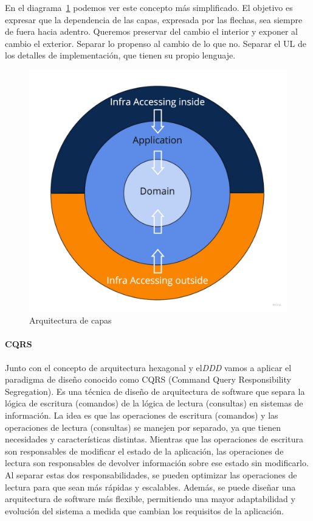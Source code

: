 En el diagrama~\cref{fig:layers} podemos ver este concepto más simplificado. El objetivo es expresar que la dependencia de las capas, expresada por las flechas, sea siempre de fuera hacia adentro. Queremos preservar del cambio el interior y exponer al cambio el exterior. Separar lo propenso al cambio de lo que no. Separar el UL de los detalles de implementación, que tienen su propio lenguaje.

\begin{figure}[H]
    \centering
    \includegraphics[height=0.3\textheight]{./part/Proyecto_ejecutivo/memoria_descriptiva/infoPreviaAntecedentes/img/PFM - Layer}
    \caption{Arquitectura de capas}\label{fig:layers}
\end{figure}

\paragraph{CQRS}

Junto con el concepto de arquitectura hexagonal y el\textit{DDD} vamos a aplicar el paradigma de diseño conocido como \gls{CQRS} (Command Query Responsibility Segregation). Es una técnica de diseño de arquitectura de software que separa la lógica de escritura (comandos) de la lógica de lectura (consultas) en sistemas de información. La idea es que las operaciones de escritura (comandos) y las operaciones de lectura (consultas) se manejen por separado, ya que tienen necesidades y características distintas. Mientras que las operaciones de escritura son responsables de modificar el estado de la aplicación, las operaciones de lectura son responsables de devolver información sobre ese estado sin modificarlo. Al separar estas dos responsabilidades, se pueden optimizar las operaciones de lectura para que sean más rápidas y escalables. Además, se puede diseñar una arquitectura de software más flexible, permitiendo una mayor adaptabilidad y evolución del sistema a medida que cambian los requisitos de la aplicación.

